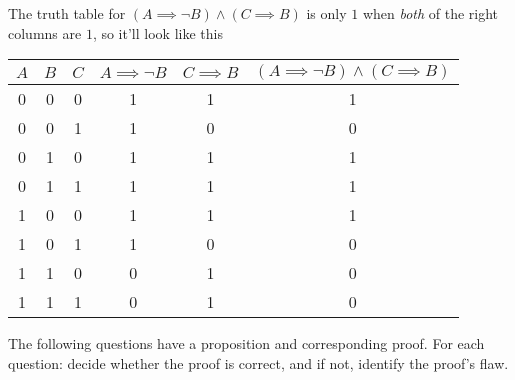 \documentclass[11pt, preview]{standalone} %
\begin{document}
\begin{enumerate}
\begin{Choices}
\begin{enumerate}[(a)]
    The truth table for $(A \implies \lnot B) \land (C \implies B)$ is only $1$ when {\it both} of the right columns are $1$, so it'll look like this

    \begin{tabular}{ c | c | c || c | c | c} 
    $A$ & $B$ & $C$ & $A \implies \lnot B$ & $C \implies B$ & $(A \implies \lnot B) \land (C \implies B)$\\
    \hline
    0 & 0 & 0 & 1 & 1 & 1\\
    0 & 0 & 1 & 1 & 0 & 0\\
    0 & 1 & 0 & 1 & 1 & 1\\
    0 & 1 & 1 & 1 & 1 & 1\\
    1 & 0 & 0 & 1 & 1 & 1\\
    1 & 0 & 1 & 1 & 0 & 0\\
    1 & 1 & 0 & 0 & 1 & 0\\
    1 & 1 & 1 & 0 & 1 & 0
    \end{tabular}

  \end{enumerate}
\end{Choices}

The following questions have a proposition and corresponding proof. For each question: decide whether the proof is correct, and if not, identify the proof's flaw.


\end{enumerate}
\end{document}
